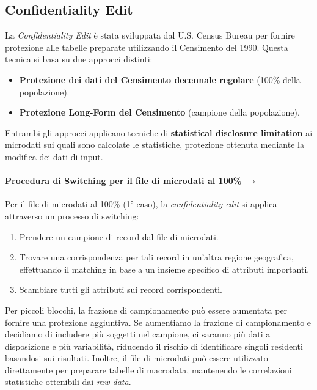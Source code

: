 \documentclass{report}
\begin{document}
\newpage
\newpage

\subsection{Confidentiality Edit}
La \textit{Confidentiality Edit} è stata sviluppata dal U.S. Census Bureau per fornire protezione alle tabelle preparate utilizzando il Censimento del 1990. Questa tecnica si basa su due approcci distinti:
\begin{itemize}
    \item \textbf{Protezione dei dati del Censimento decennale regolare} (100\% della popolazione).
    \item \textbf{Protezione Long-Form del Censimento} (campione della popolazione).
\end{itemize}

\noindent Entrambi gli approcci applicano tecniche di \textbf{statistical disclosure limitation} ai microdati sui quali sono calcolate le statistiche, protezione ottenuta mediante la modifica dei dati di input.

\paragraph{Procedura di Switching per il file di microdati al 100\% $\rightarrow$} 
Per il file di microdati al 100\% (1° caso), la \textit{confidentiality edit} si applica attraverso un processo di switching:
\begin{enumerate}
    \item Prendere un campione di record dal file di microdati.
    \item Trovare una corrispondenza per tali record in un'altra regione geografica, effettuando il matching in base a un insieme specifico di attributi importanti.
    \item Scambiare tutti gli attributi sui record corrispondenti.
\end{enumerate}

\noindent Per piccoli blocchi, la frazione di campionamento può essere aumentata per fornire una protezione aggiuntiva. 
Se aumentiamo la frazione di campionamento e decidiamo di includere più soggetti nel campione, ci saranno più dati a disposizione e più variabilità, 
riducendo il rischio di identificare singoli residenti basandosi sui risultati. Inoltre, il file di microdati può essere utilizzato direttamente per preparare tabelle di macrodata, 
mantenendo le correlazioni statistiche ottenibili dai  \textit{raw data}.
\end{document}
